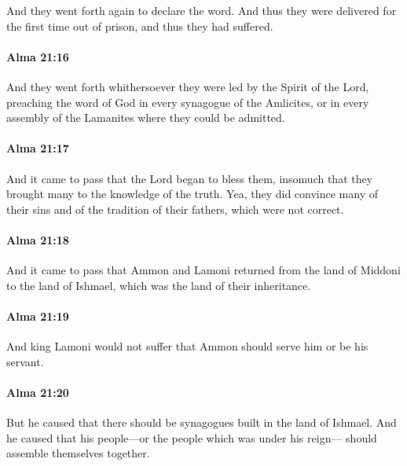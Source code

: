 			And they went forth again to declare the word.
			And thus they were delivered for the first time out of prison,
			and thus they had suffered.

		\paragraph{Alma 21:16} %
			\label{ALMA-21-16}

			And they went forth whithersoever they were led by the Spirit of the Lord,
			preaching the word of God in every synagogue of the Amlicites,
			or in every assembly of the Lamanites where they could be admitted.

		\paragraph{Alma 21:17} %
			\label{ALMA-21-17}

			And it came to pass that the Lord began to bless them,
			insomuch that they brought many to the knowledge of the truth.
			Yea, they did convince many of their sins
			and of the tradition of their fathers, which were not correct.

		\paragraph{Alma 21:18} %
			\label{ALMA-21-18}

			And it came to pass that Ammon and Lamoni returned from the land of Middoni
			to the land of Ishmael, which was the land of their inheritance.

		\paragraph{Alma 21:19} %
			\label{ALMA-21-19}

			And king Lamoni would not suffer
			that Ammon should serve him or be his servant.

		\paragraph{Alma 21:20} %
			\label{ALMA-21-20}

			But he caused that there should be synagogues built in the land of Ishmael.
			And he caused that his people---or the people which was under his reign---
			should assemble themselves together.

